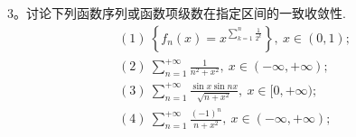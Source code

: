 3。讨论下列函数序列或函数项级数在指定区间的一致收敛性.
\[
\begin{gathered}
  (1)\ \left\{f_n(x)=x^{\sum_{k=1}^n\frac1{2^k}}\right\},\ x\in(0,1);\\
  (2)\ \sum_{n=1}^{+\infty}\frac1{n^2+x^2},\ x\in(-\infty,+\infty);\\
  (3)\ \sum_{n=1}^{+\infty}\frac{\sin x\sin nx}{\sqrt{n+x^2}},\ x\in[0,+\infty);\\
  (4)\ \sum_{n=1}^{+\infty}\frac{(-1)^n}{n+x^2},\ x\in(-\infty,+\infty);
\end{gathered}
\]

